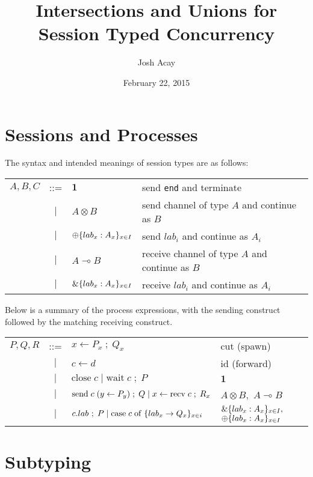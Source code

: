 \documentclass[11pt]{article}
\title{Intersections and Unions for Session Typed Concurrency}
\date{February 22, 2015}
\author{Josh Acay}
\theoremstyle{plain}
\theoremstyle{definition}
\theoremstyle{remark}
\DeclarePairedDelimiter\parens{(}{)}             %
\DeclarePairedDelimiter\braces{\lbrace}{\rbrace} %
\newcommand\indexVar{x}
\newcommand\lolli{\multimap}
\newcommand\terminate{\mathbf{1}}
\newcommand\tensor{\otimes}
\newcommand\lab{lab}
\newcommand\internal{\oplus}
\newcommand\external{\&}
\newcommand\internals[2]{\internal\braces{\lab_\indexVar : {#1}_\indexVar}_{\indexVar \in #2}}
\newcommand\externals[2]{\external\braces{\lab_\indexVar : {#1}_\indexVar}_{\indexVar \in #2}}
\newcommand\seq{\;;\;}
\newcommand\tbranches[2]{\braces{\lab_\indexVar \rightarrow {#1}_\indexVar}_{\indexVar \in #2}}
\newcommand\tfwd[2]{#1 \leftarrow #2}
\newcommand\tspawn[3]{#1 \leftarrow #2 \seq #3}
\newcommand\tclose[1]{\mathrm{close}\;#1}
\newcommand\twait[2]{\mathrm{wait}\;#1 \seq #2}
\newcommand\tsend[4]{\mathrm{send}\; #1 \; \parens{#2 \leftarrow #3} \seq #4}
\newcommand\trecv[3]{#1 \leftarrow \mathrm{recv} \; #2 \seq #3}
\newcommand\tcase[2]{\mathrm{case}\;#1\;\mathrm{of}\;#2}
\newcommand\tselect[3]{#1 . \lab_{#2} \seq #3}
\begin{document}
\maketitle


\section{Sessions and Processes}

The syntax and intended meanings of session types are as follows:

\begin{center}
\begin{tabular}{l c l l}
  $A, B, C$ & ::= & $\terminate$        & send \texttt{end} and terminate \\
            & $|$ & $A \tensor B$       & send channel of type $A$ and continue as $B$ \\
            & $|$ & $\internals{A}{I}$  & send $\lab_i$ and continue as $A_i$ \\
            & $|$ & $A \lolli B$        & receive channel of type $A$ and continue as $B$ \\
            & $|$ & $\externals{A}{I}$  & receive $\lab_i$ and continue as $A_i$ \\
\end{tabular}
\end{center}

Below is a summary of the process expressions, with the sending construct
followed by the matching receiving construct.

\begin{center}
\begin{tabular}{l c l l}
  $P, Q, R$ & ::= & $\tspawn{x}{P_x}{Q_x}$     & cut (spawn) \\
            & $|$ & $\tfwd c d$                & id (forward) \\
            & $|$ & $\tclose c \mid \twait c P$  & $\terminate$ \\
            & $|$ & $\tsend{c}{y}{P_y}{Q} \mid \trecv{x}{c}{R_x}$ & $A \tensor B,$ $A \lolli B$ \\
            & $|$ & $\tselect{c}{}{P} \mid \tcase c {\tbranches Q i}$  & $\externals A I,$ $\internals A I$
\end{tabular}
\end{center}


\section{Subtyping}
\end{document}
